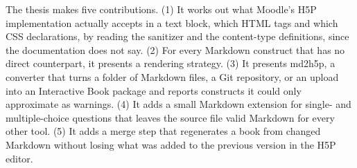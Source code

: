 The thesis makes five contributions.
(1) It works out what Moodle's H5P implementation actually
accepts in a text block, which HTML tags and which CSS declarations, by reading the sanitizer and
the content-type definitions, since the documentation does not say.
(2) For every
Markdown construct that has no direct counterpart, it presents a rendering strategy.
(3) It presents md2h5p, a
converter that turns a folder of Markdown files, a Git repository, or an upload into an Interactive
Book package and reports constructs it could only approximate as warnings.
(4) It adds a
small Markdown extension for single- and multiple-choice questions that leaves the source file
valid Markdown for every other tool.
(5) It adds a merge step that regenerates a book from changed
Markdown without losing what was added to the previous version in the H5P editor.
